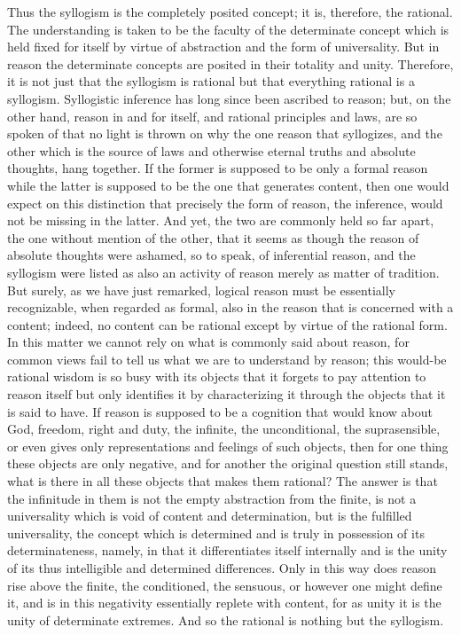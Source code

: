 Thus the syllogism is the completely posited concept;
it is, therefore, the rational.
The understanding is taken to be
the faculty of the determinate concept
which is held fixed for itself by virtue of
abstraction and the form of universality.
But in reason the determinate concepts are
posited in their totality and unity.
Therefore, it is not just that the syllogism is rational
but that everything rational is a syllogism.
Syllogistic inference has long since been ascribed to reason;
but, on the other hand, reason in and for itself,
and rational principles and laws,
are so spoken of that no light is thrown
on why the one reason that syllogizes,
and the other which is the source
of laws and otherwise eternal truths
and absolute thoughts, hang together.
If the former is supposed to be
only a formal reason
while the latter is supposed to be
the one that generates content,
then one would expect on this distinction
that precisely the form of reason,
the inference, would not be missing in the latter.
And yet, the two are commonly held so far apart,
the one without mention of the other,
that it seems as though the reason
of absolute thoughts were ashamed,
so to speak, of inferential reason,
and the syllogism were listed as also
an activity of reason merely as matter of tradition.
But surely, as we have just remarked,
logical reason must be essentially recognizable,
when regarded as formal, also in the reason
that is concerned with a content;
indeed, no content can be rational
except by virtue of the rational form.
In this matter we cannot rely on
what is commonly said about reason,
for common views fail to tell us
what we are to understand by reason;
this would-be rational wisdom is so busy with its objects
that it forgets to pay attention to reason itself
but only identifies it by characterizing it
through the objects that it is said to have.
If reason is supposed to be a cognition
that would know about God, freedom, right and duty,
the infinite, the unconditional, the suprasensible,
or even gives only representations and feelings of such objects,
then for one thing these objects are only negative,
and for another the original question still stands,
what is there in all these objects that makes them rational?
The answer is that the infinitude in them
is not the empty abstraction from the finite,
is not a universality which is void of content and determination,
but is the fulfilled universality, the concept which is determined
and is truly in possession of its determinateness,
namely, in that it differentiates itself internally
and is the unity of its thus intelligible and determined differences.
Only in this way does reason rise above
the finite, the conditioned, the sensuous,
or however one might define it,
and is in this negativity essentially replete with content,
for as unity it is the unity of determinate extremes.
And so the rational is nothing but the syllogism.

